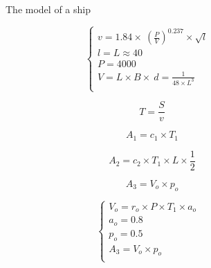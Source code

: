 \documentclass{mcmthesis}
\begin{document}
\begin{figure}[tbp]
  \caption{The model of a ship}\label{figure1}
\end{figure}

\begin{equation}
\left\{
\begin{array}{lr}
v=1.84\times \ (\frac{P}{V}) ^{0.237} \times \sqrt{l} &\\
l=L\approx 40 &\\
P=4000&\\
V=L\times B\times\ d =\frac{1}{48\times L^3}\\
\end{array}
\right.
\end{equation}

\begin{equation}\label{5}
T=\frac{S}{v}
\end{equation}


\begin{equation}\label{5}
A_1=c_1 \times T_1
\end{equation}

\begin{equation}\label{6}
A_2=c_2  \times T_1 \times L \times  \frac{1}{2}
\end{equation}

\begin{equation}\label{7}
A_3=V_o  \times p_o
\end{equation}

\begin{equation}
\left\{
\begin{array}{lr}
V_o=r_o \times P \times T_1 \times a_o &\\
a_o=0.8&\\
p_o=0.5&\\
A_3=V_o  \times p_o\\
\end{array}
\right.
\end{equation}
\end{document}
